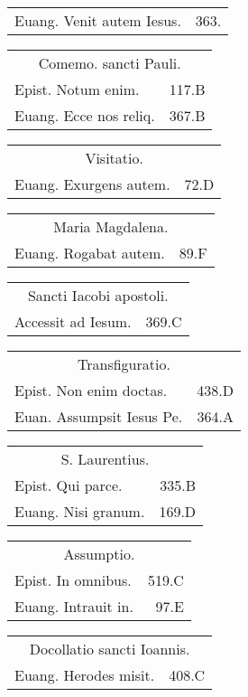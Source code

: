\documentclass[a5paper,10pt]{book}
\begin{document}
\begin{multicols}{2}
\begin{tabular}{l r}
Euang. Venit autem Iesus. & 363.\\%
\end{tabular}
\begin{tabular}{l r}
\multicolumn{2}{c}{\color{red} Comemo. sancti Pauli.}\\
Epist. Notum enim. & 117.B\\
Euang. Ecce nos reliq. & 367.B\\
\end{tabular}
\begin{tabular}{l r}
\multicolumn{2}{c}{\color{red} Visitatio.}\\
Euang. Exurgens autem. & 72.D\\
\end{tabular}
\begin{tabular}{l r}
\multicolumn{2}{c}{\color{red} Maria Magdalena.}\\
Euang. Rogabat autem. & 89.F\\
\end{tabular}
\begin{tabular}{l r}
\multicolumn{2}{c}{\color{red} Sancti Iacobi apostoli.}\\
Accessit ad Iesum. & 369.C\\
\end{tabular}
\begin{tabular}{l r}
\multicolumn{2}{c}{\color{red} Transfiguratio.}\\
Epist. Non enim doctas. & 438.D\\
Euan. Assumpsit Iesus Pe. & 364.A\\
\end{tabular}
\begin{tabular}{l r}
\multicolumn{2}{c}{\color{red} S. Laurentius.}\\
Epist. Qui parce. & 335.B\\
Euang. Nisi granum. & 169.D\\
\end{tabular}
\begin{tabular}{l r}
\multicolumn{2}{c}{\color{red} Assumptio.}\\
Epist. In omnibus. & 519.C\\
Euang. Intrauit in. & 97.E\\
\end{tabular}
\begin{tabular}{l r}
\multicolumn{2}{c}{\color{red} Docollatio sancti Ioannis.}\\
Euang. Herodes misit. & 408.C\\
\end{tabular}

\end{multicols}
\end{document}
